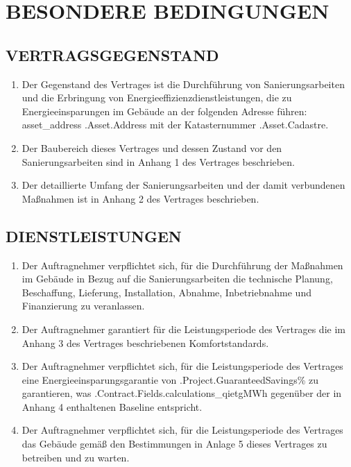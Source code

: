 \section{BESONDERE BEDINGUNGEN}
\subsection{VERTRAGSGEGENSTAND}
\begin{enumerate}
  \item Der Gegenstand des Vertrages ist die Durchführung von Sanierungsarbeiten und die Erbringung von Energieeffizienzdienstleistungen, die zu Energieeinsparungen im Gebäude an der folgenden Adresse führen: {{asset_address .Asset.Address}} mit der Katasternummer {{.Asset.Cadastre}}.
  \item Der Baubereich dieses Vertrages und dessen Zustand vor den Sanierungsarbeiten sind in Anhang 1 des Vertrages beschrieben.
  \item Der detaillierte Umfang der Sanierungsarbeiten und der damit verbundenen Maßnahmen ist in Anhang 2 des Vertrages beschrieben.
\end{enumerate}

\subsection{DIENSTLEISTUNGEN}
\begin{enumerate}
  \item Der Auftragnehmer verpflichtet sich, für die Durchführung der Maßnahmen im Gebäude in Bezug auf die Sanierungsarbeiten die technische Planung, Beschaffung, Lieferung, Installation, Abnahme, Inbetriebnahme und Finanzierung zu veranlassen.
  \item Der Auftragnehmer garantiert für die Leistungsperiode des Vertrages die im Anhang 3 des Vertrages beschriebenen Komfortstandards.
  \item Der Auftragnehmer verpflichtet sich, für die Leistungsperiode des Vertrages eine Energieeinsparungsgarantie von {{.Project.GuaranteedSavings}}\% zu garantieren, was {{.Contract.Fields.calculations_qietg}}MWh  gegenüber der in Anhang 4 enthaltenen Baseline entspricht.
  \item Der Auftragnehmer verpflichtet sich, für die Leistungsperiode des Vertrages das Gebäude gemäß den Bestimmungen in Anlage 5 dieses Vertrages zu betreiben und zu warten.
\end{enumerate}

